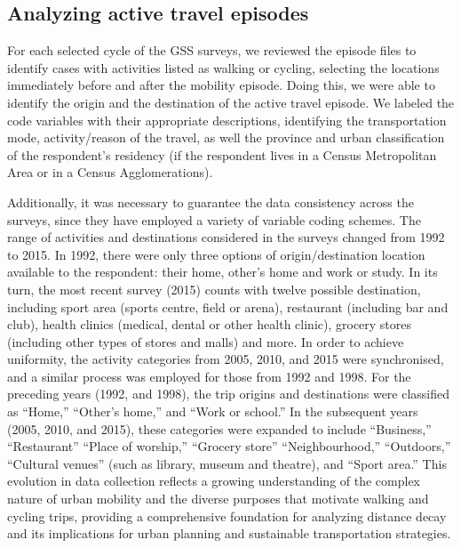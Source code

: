 \documentclass[preprint, 3p,
authoryear]{elsarticle} %
\begin{document}
\hypertarget{analyzing-active-travel-episodes}{%
\subsection{Analyzing active travel
episodes}\label{analyzing-active-travel-episodes}}

For each selected cycle of the GSS surveys, we reviewed the episode
files to identify cases with activities listed as walking or cycling,
selecting the locations immediately before and after the mobility
episode. Doing this, we were able to identify the origin and the
destination of the active travel episode. We labeled the code variables
with their appropriate descriptions, identifying the transportation
mode, activity/reason of the travel, as well the province and urban
classification of the respondent's residency (if the respondent lives in
a Census Metropolitan Area or in a Census Agglomerations).

Additionally, it was necessary to guarantee the data consistency across
the surveys, since they have employed a variety of variable coding
schemes. The range of activities and destinations considered in the
surveys changed from 1992 to 2015. In 1992, there were only three
options of origin/destination location available to the respondent:
their home, other's home and work or study. In its turn, the most recent
survey (2015) counts with twelve possible destination, including sport
area (sports centre, field or arena), restaurant (including bar and
club), health clinics (medical, dental or other health clinic), grocery
stores (including other types of stores and malls) and more. In order to
achieve uniformity, the activity categories from 2005, 2010, and 2015
were synchronised, and a similar process was employed for those from
1992 and 1998. For the preceding years (1992, and 1998), the trip
origins and destinations were classified as ``Home,'' ``Other's home,''
and ``Work or school.'' In the subsequent years (2005, 2010, and 2015),
these categories were expanded to include ``Business,'' ``Restaurant''
``Place of worship,'' ``Grocery store'' ``Neighbourhood,'' ``Outdoors,''
``Cultural venues'' (such as library, museum and theatre), and ``Sport
area.'' This evolution in data collection reflects a growing
understanding of the complex nature of urban mobility and the diverse
purposes that motivate walking and cycling trips, providing a
comprehensive foundation for analyzing distance decay and its
implications for urban planning and sustainable transportation
strategies.
\end{document}

